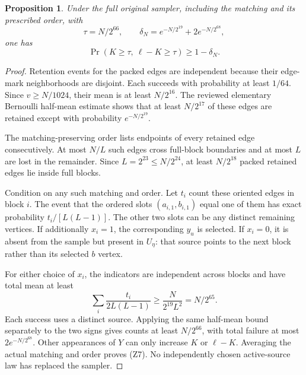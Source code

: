 \documentclass[11pt]{article}
\newtheorem{proposition}{Proposition}
\begin{document}
\begin{proposition}
Under the full original sampler, including the matching and its
prescribed order, with
\[
 \tau=N/2^{66},\qquad
 \delta_N=e^{-N/2^{19}}+2e^{-N/2^{68}},
\]
one has
\[
                 \Pr(K\ge\tau,\ \ell-K\ge\tau)
                              \ge1-\delta_N.             \tag{Z7}
\]
\end{proposition}
\begin{proof}
Retention events for the packed edges are independent because
their edge-mark neighborhoods are disjoint.
Each succeeds with probability at least $1/64$.
Since $v\ge N/1024$, their mean is at least $N/2^{16}$.
The reviewed elementary Bernoulli half-mean estimate shows that
at least $N/2^{17}$ of these edges are retained except with
probability $e^{-N/2^{19}}$.

The matching-preserving order lists endpoints of every retained
edge consecutively. At most $N/L$ such edges cross full-block
boundaries and at most $L$ are lost in the remainder.
Since $L=2^{23}\le N/2^{24}$, at least $N/2^{18}$ packed retained
edges lie inside full blocks.

Condition on any such matching and order. Let $t_i$ count these
oriented edges in block $i$. The event that the ordered slots
$(a_{i,1},b_{i,1})$ equal one of them has exact probability
$t_i/[L(L-1)]$. The other two slots can be any distinct remaining
vertices. If additionally $x_i=1$, the corresponding $y_u$ is
selected. If $x_i=0$, it is absent from the sample but present
in $U_\eta$: that source points to the next block rather than
its selected $b$ vertex.

For either choice of $x_i$, the indicators are independent across
blocks and have total mean at least
\[
 \sum_i\frac{t_i}{2L(L-1)}
                  \ge\frac{N}{2^{19}L^2}=N/2^{65}.
\]
Each success uses a distinct source. Applying the same half-mean
bound separately to the two signs gives counts at least
$N/2^{66}$, with total failure at most $2e^{-N/2^{68}}$.
Other appearances of $Y$ can only increase $K$ or $\ell-K$.
Averaging the actual matching and order proves (Z7).
No independently chosen active-source law has replaced the sampler.
\end{proof}
\end{document}
